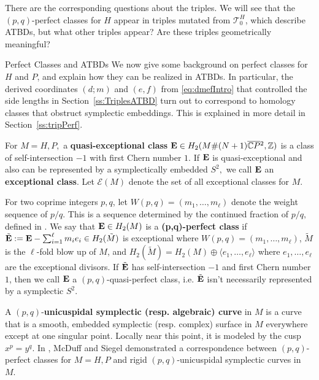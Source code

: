 \documentclass[11pt, reqno]{amsart}
\makeatletter
\def\subsection{\@startsection{subsection}{2}%
  \z@{.5\linespacing\@plus.7\linespacing}{-.5em}%
  {\normalfont\large\bfseries}}
\theoremstyle{remark}
\numberwithin{equation}{subsection}
\numberwithin{figure}{section}
\theoremstyle{customremark}
\newcommand{\oCP}{{\overline{{\C}P}}\!\,}
\newcommand{\bE}{{\bf{E}}}
\newcommand{\Z}{\mathbb{Z}}
\newcommand{\C}{\mathbb{C}}
\newcommand{\T}{\mathcal{T}}
\makeatother
\begin{document}
There are the corresponding questions about the triples. We will see that the $(p,q)$-perfect classes for $H$ appear in triples mutated from $\T_0^H$, which describe ATBDs, but what other triples appear? Are these triples geometrically meaningful? 


\subsection{Perfect Classes and ATBDs} \label{ss:IntroperfectClasses}
We now give some background on perfect classes for $H$ and $P$, and explain how they can be realized in ATBDs. In particular, the derived coordinates $(d;m)$ and $(e,f)$ from \eqref{eq:dmefIntro} that controlled the side lengths in Section~\ref{ss:TriplesATBD} turn out to correspond to homology classes that obstruct symplectic embeddings. This is explained in more detail in Section~\ref{ss:tripPerf}. 

For $M=H,P,$
 a {\bf quasi-exceptional class} $\bE \in H_2(M \# (N+1) \oCP^2,\Z)$ is a class of self-intersection $-1$ with first Chern number $1$. If $\bE$ is quasi-exceptional and also can be represented by a symplectically embedded $S^2,$ we call $\bE$ an {\bf exceptional class}. Let $\mathcal{E}(M)$ denote the set of all exceptional classes for $M$.

For two coprime integers $p,q$, let $W(p,q)=(m_1,\hdots,m_\ell)$ denote the weight sequence of $p/q.$ This is a sequence determined by the continued fraction of $p/q,$ defined in \cite[Definition 1.2.5]{ball}. We say that $\bE \in H_2(M)$ is a {\bf (p,q)-perfect class} if 
$\tilde{\bE}:=\bE-\sum_{i=1}^\ell m_i e_i \in H_2(\tilde{M})$ is exceptional where
$W(p,q)=(m_1,\hdots,m_\ell)$, $\tilde{M}$ is the $\ell$-fold blow up of $M$, and $H_2(\tilde{M})=H_2(M) \oplus \langle e_1,\hdots,e_\ell \rangle$ where $e_1,\hdots, e_\ell$ are the exceptional divisors.  If $\tilde{\bE}$ has self-intersection $-1$ and first Chern number $1$, then we call $\bE$ a $(p,q)$-quasi-perfect class, i.e. $\tilde{\bE}$ isn't necessarily represented by a symplectic $S^2.$

A $(p,q)$-{\bf unicuspidal symplectic (resp. algebraic) curve} in $M$ is a curve that is a smooth, embedded symplectic (resp. complex) surface in $M$ everywhere except at one singular point. Locally near this point, it is modeled by the cusp $x^p = y^q$. In \cite[Theorem G]{MS1}, McDuff and Siegel demonstrated a correspondence between $(p,q)$-perfect classes for $M=H,P$ and rigid $(p,q)$-unicuspidal symplectic curves in $M.$  
\end{document}
